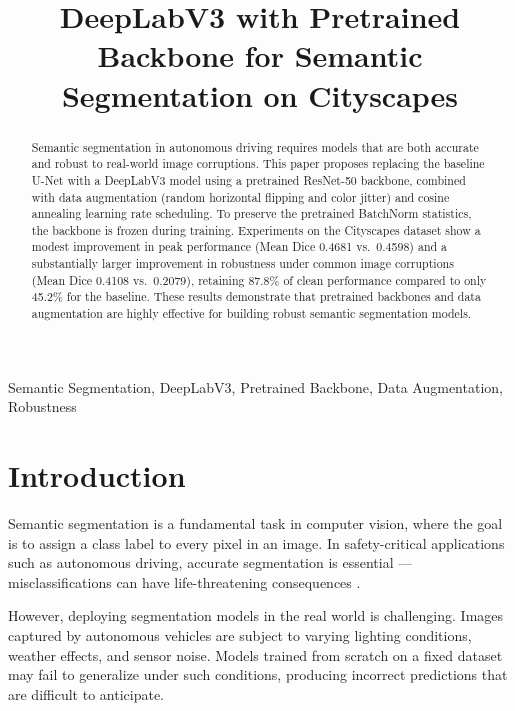 \documentclass[conference]{IEEEtran}
\begin{document}
\title{DeepLabV3 with Pretrained Backbone for Semantic Segmentation on Cityscapes}

\author{
}

\maketitle

\begin{abstract}
Semantic segmentation in autonomous driving requires models that are both accurate and robust to real-world image corruptions. This paper proposes replacing the baseline U-Net with a DeepLabV3 model using a pretrained ResNet-50 backbone, combined with data augmentation (random horizontal flipping and color jitter) and cosine annealing learning rate scheduling. To preserve the pretrained BatchNorm statistics, the backbone is frozen during training. Experiments on the Cityscapes dataset show a modest improvement in peak performance (Mean Dice 0.4681 vs.\ 0.4598) and a substantially larger improvement in robustness under common image corruptions (Mean Dice 0.4108 vs.\ 0.2079), retaining 87.8\% of clean performance compared to only 45.2\% for the baseline. These results demonstrate that pretrained backbones and data augmentation are highly effective for building robust semantic segmentation models.
\end{abstract}

\begin{IEEEkeywords}
Semantic Segmentation, DeepLabV3, Pretrained Backbone, Data Augmentation, Robustness
\end{IEEEkeywords}


\section{Introduction}

Semantic segmentation is a fundamental task in computer vision, where the goal is to assign a class label to every pixel in an image. In safety-critical applications such as autonomous driving, accurate segmentation is essential — misclassifications can have life-threatening consequences \cite{grigorescu2020survey}.

However, deploying segmentation models in the real world is challenging. Images captured by autonomous vehicles are subject to varying lighting conditions, weather effects, and sensor noise. Models trained from scratch on a fixed dataset may fail to generalize under such conditions, producing incorrect predictions that are difficult to anticipate.
\end{document}
